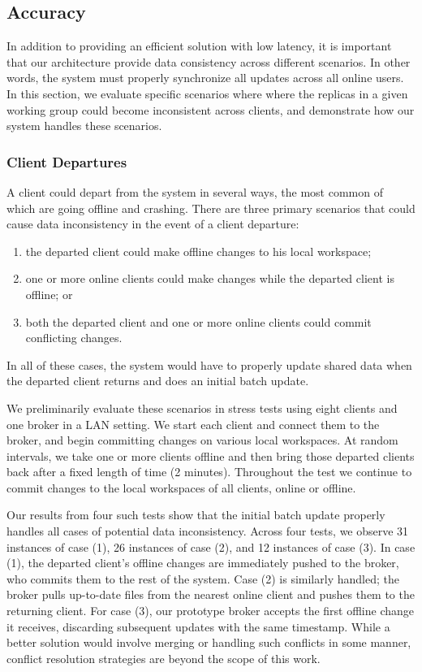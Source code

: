 \subsection{Accuracy}
\label{evaluation.accuracy}
In addition to providing an efficient solution with low latency,
it is important that our architecture provide data consistency across different
scenarios.
In other words, the system must properly synchronize
all updates across all online users.
In this section, we evaluate specific scenarios where
where the replicas in a given working group could become inconsistent across clients,
and demonstrate how our system handles these scenarios.

\subsubsection{Client Departures}
A client could depart from the system in several ways,
the most common of which are going offline and crashing.
There are three primary scenarios that could cause
data inconsistency in the event of a client departure:
\begin{enumerate}[(1)]
\item the departed client could make offline changes to his local workspace;
\item one or more online clients could make changes while the departed client is offline; or
\item both the departed client and one or more online clients could commit conflicting changes.
\end{enumerate}
In all of these cases, the system would have to properly update shared data
when the departed client returns and does an initial batch update.

We preliminarily evaluate these scenarios 
in stress tests using eight clients and one broker in a LAN setting.
We start each client and connect them to the broker,
and begin committing changes on various local workspaces.
At random intervals, we take one or more clients offline
and then bring those departed clients back after a fixed length of time (2 minutes).
Throughout the test we continue to commit changes to the local workspaces of all clients, online or offline.

Our results from four such tests show that the initial batch update
properly handles all cases of potential data inconsistency.
Across four tests, we observe 31 instances of case (1),
26 instances of case (2), and 12 instances of case (3).
In case (1), the departed client's offline changes are immediately pushed
to the broker,
who commits them to the rest of the system.
Case (2) is similarly handled;
the broker pulls up-to-date files from the nearest online client
and pushes them to the returning client.
For case (3), our prototype broker accepts the first
offline change it receives, discarding subsequent updates
with the same timestamp.
While a better solution would involve merging or handling
such conflicts in some manner,
conflict resolution strategies are beyond the scope of this work.

